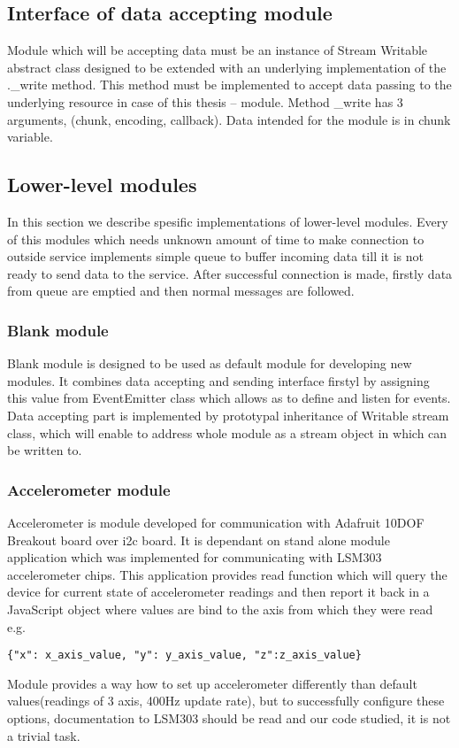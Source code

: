 \subsection{Interface of data accepting module} %
\label{ssub:interface_of_data_accepting_module}
Module which will be accepting data must be an instance of Stream Writable abstract class designed to be extended with an underlying implementation of the .\_write method. This method must be implemented to accept data passing to the underlying resource in case of this thesis -- module. Method \_write  has 3 arguments, (chunk, encoding, callback). Data intended for the module is in chunk variable.
\subsection{Lower-level modules} %
\label{sub:lower_level_modules}
In this section we describe spesific implementations of lower-level modules. Every of this modules which needs unknown amount of time to make connection to outside service implements simple queue to buffer incoming data till it is not ready to send data to the service. After successful connection is made, firstly data from queue are emptied and then normal messages are followed.
\subsubsection{Blank module} %
\label{ssub:blank_module}
Blank module is designed to be used as default module for developing new modules. It combines data accepting and sending interface firstyl by assigning this value from EventEmitter class which allows as to define and listen for events. Data accepting part is implemented by prototypal inheritance of Writable stream class, which will enable to address whole module as a stream object in which can be written to.
\subsubsection{Accelerometer module} %
\label{ssub:accelerometer_module}
Accelerometer is module developed for communication with Adafruit 10DOF Breakout board over \gls{i2c} board. It is dependant on stand alone module application which was implemented for communicating with LSM303 accelerometer chips. This application provides read function which will query the device for current state of accelerometer readings and then report it back in a JavaScript object where values are bind to the axis from which they were read e.g.
\begin{verbatim}{"x": x_axis_value, "y": y_axis_value, "z":z_axis_value}\end{verbatim}
Module provides a way how to set up accelerometer differently than default values(readings of 3 axis, 400Hz update rate), but to successfully configure these options, documentation to LSM303 should be read and our code studied, it is not a trivial task.
